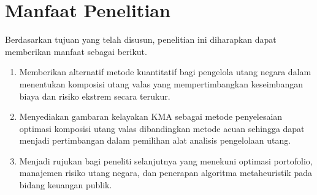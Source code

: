     \section{Manfaat Penelitian}\label{sec:benefit}

        Berdasarkan tujuan yang telah disusun, penelitian ini diharapkan dapat memberikan manfaat sebagai berikut.
        \begin{enumerate}
            \item Memberikan alternatif metode kuantitatif bagi pengelola utang negara dalam menentukan komposisi utang valas yang mempertimbangkan keseimbangan biaya dan risiko ekstrem secara terukur.
            \item Menyediakan gambaran kelayakan KMA sebagai metode penyelesaian optimasi komposisi utang valas dibandingkan metode acuan sehingga dapat menjadi pertimbangan dalam pemilihan alat analisis pengelolaan utang.
            \item Menjadi rujukan bagi peneliti selanjutnya yang menekuni optimasi portofolio, manajemen risiko utang negara, dan penerapan algoritma metaheuristik pada bidang keuangan publik.
        \end{enumerate}
